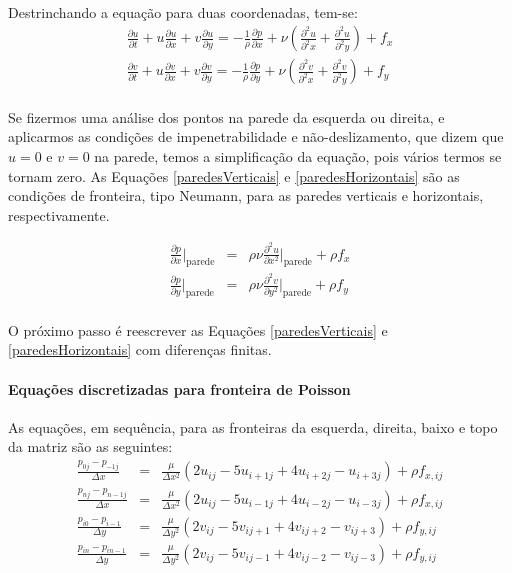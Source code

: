 \documentclass[poisson.tex]{subfiles}
\begin{document}
\paragraph{} Destrinchando a equação para duas coordenadas, tem-se:
\begin{eqnarray}
\frac{\partial u}{\partial t}+u\frac{\partial u}{\partial x}+v\frac{\partial
u}{\partial y}=-\frac{1}{\rho}\frac{\partial p}{\partial
x}+\nu\left(\frac{\partial^2 u}{\partial^2 x}+\frac{\partial^2 u}{\partial^2
y}\right)+f_x\\
\frac{\partial v}{\partial t}+u\frac{\partial v}{\partial x}+v\frac{\partial
v}{\partial y}=-\frac{1}{\rho}\frac{\partial p}{\partial
y}+\nu\left(\frac{\partial^2 v}{\partial^2 x}+\frac{\partial^2 v}{\partial^2
y}\right)+f_y
\end{eqnarray}
\paragraph{} Se fizermos uma análise dos pontos na parede da esquerda ou
direita, e aplicarmos as condições de impenetrabilidade e não-deslizamento, que
dizem que $u=0$ e $v=0$ na parede, temos a simplificação da equação, pois vários
termos se tornam zero. As Equações \ref{paredesVerticais} e \ref{paredesHorizontais} são as condições de fronteira, tipo Neumann, para as paredes verticais e horizontais, respectivamente.

\begin{eqnarray}
\frac{\partial p}{\partial x}\Bigg|_{\textrm{parede}}&=&\rho\nu\frac{\partial^2
u}{\partial x^2}\Bigg|_{\textrm{parede}}+\rho f_x\label{paredesVerticais}\\
\frac{\partial p}{\partial y}\Bigg|_{\textrm{parede}}&=&\rho\nu\frac{\partial^2
v}{\partial y^2}\Bigg|_{\textrm{parede}}+\rho f_y\label{paredesHorizontais}
\end{eqnarray}
\paragraph{} O próximo passo é reescrever as Equações \ref{paredesVerticais}  e \ref{paredesHorizontais} com diferenças finitas. 
\paragraph{Equações discretizadas para fronteira de Poisson} As equações, em
sequência, para as fronteiras da esquerda, direita, baixo e topo da matriz são
as seguintes:
\begin{eqnarray}
\frac{p_{0j}-p_{-1j}}{\Delta x}&=&\frac{\mu}{\Delta x^2}(2u_{ij}-5u_{i+1j}+4u_{i+2j}-u_{i+3j})+\rho f_{x,ij} \label{pressure_01}\\
\frac{p_{nj}-p_{n-1j}}{\Delta x}&=&\frac{\mu}{\Delta x^2}(2u_{ij}-5u_{i-1j}+4u_{i-2j}-u_{i-3j})+\rho f_{x,ij}\label{pressure_02}\\
\frac{p_{i0}-p_{i-1}}{\Delta y}&=&\frac{\mu}{\Delta y^2}(2v_{ij}-5v_{ij+1}+4v_{ij+2}-v_{ij+3})+\rho f_{y,ij} \label{pressure_03}\\
\frac{p_{in}-p_{in-1}}{\Delta y}&=&\frac{\mu}{\Delta y^2}(2v_{ij}-5v_{ij-1}+4v_{ij-2}-v_{ij-3})+\rho f_{y,ij} \label{pressure_04}
\end{eqnarray}
\end{document}
